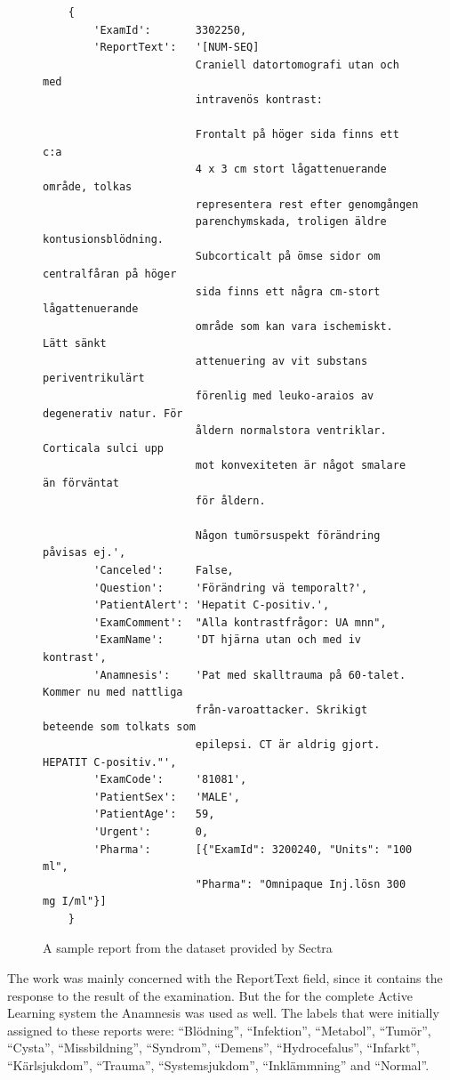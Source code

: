 \begin{figure}
\begin{verbatim}
    {
        'ExamId':       3302250, 
        'ReportText':   '[NUM-SEQ] 
                        Craniell datortomografi utan och med 
                        intravenös kontrast:
                        
                        Frontalt på höger sida finns ett c:a 
                        4 x 3 cm stort lågattenuerande område, tolkas 
                        representera rest efter genomgången 
                        parenchymskada, troligen äldre kontusionsblödning. 
                        Subcorticalt på ömse sidor om centralfåran på höger 
                        sida finns ett några cm-stort lågattenuerande 
                        område som kan vara ischemiskt. Lätt sänkt 
                        attenuering av vit substans periventrikulärt 
                        förenlig med leuko-araios av degenerativ natur. För 
                        åldern normalstora ventriklar. Corticala sulci upp 
                        mot konvexiteten är något smalare än förväntat 
                        för åldern. 
                        
                        Någon tumörsuspekt förändring påvisas ej.',
        'Canceled':     False, 
        'Question':     'Förändring vä temporalt?',
        'PatientAlert': 'Hepatit C-positiv.', 
        'ExamComment':  "Alla kontrastfrågor: UA mnn", 
        'ExamName':     'DT hjärna utan och med iv kontrast',
        'Anamnesis':    'Pat med skalltrauma på 60-talet. Kommer nu med nattliga 
                        från-varoattacker. Skrikigt beteende som tolkats som 
                        epilepsi. CT är aldrig gjort. HEPATIT C-positiv."',
        'ExamCode':     '81081', 
        'PatientSex':   'MALE', 
        'PatientAge':   59, 
        'Urgent':       0, 
        'Pharma':       [{"ExamId": 3200240, "Units": "100 ml", 
                        "Pharma": "Omnipaque Inj.lösn 300 mg I/ml"}]
    }
\end{verbatim}
\caption{A sample report from the dataset provided by Sectra}
\label{fig:sample-report}
\end{figure}

The work was mainly concerned with the ReportText field, since it contains the response to the result of the examination.
But the for the complete Active Learning system the Anamnesis was used as well.
The labels that were initially assigned to these reports were:
``Blödning'', ``Infektion'', ``Metabol'', ``Tumör'', ``Cysta'', ``Missbildning'', ``Syndrom'', ``Demens'', ``Hydrocefalus'', ``Infarkt'', ``Kärlsjukdom'', ``Trauma'', ``Systemsjukdom'', ``Inklämmning'' and ``Normal''.

